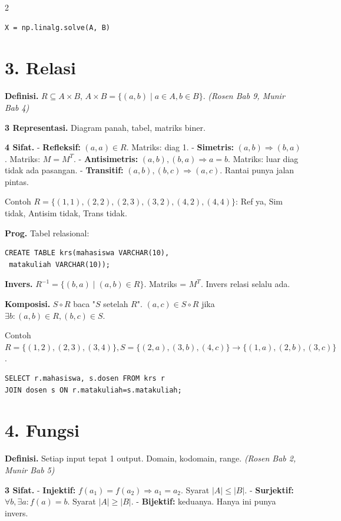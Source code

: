 \documentclass[8pt,a4paper]{extarticle}
\newcommand{\h}[1]{\textbf{#1}}
\newcommand{\src}[1]{\textit{(#1)}}
\begin{document}
\begin{multicols*}{2}
	\begin{lstlisting}
X = np.linalg.solve(A, B)
\end{lstlisting}

	\section*{3. Relasi}

	\h{Definisi.} $R\subseteq A\times B$, $A\times B{=}\{(a,b)\mid a\in A,b\in B\}$. \src{Rosen Bab 9, Munir Bab 4}

	\h{3 Representasi.} Diagram panah, tabel, matriks biner.

	\h{4 Sifat.}
	- \h{Refleksif:} $(a,a)\in R$. Matriks: diag 1.
	- \h{Simetris:} $(a,b)\Rightarrow(b,a)$. Matriks: $M{=}M^T$.
	- \h{Antisimetris:} $(a,b),(b,a)\Rightarrow a{=}b$. Matriks: luar diag tidak ada pasangan.
	- \h{Transitif:} $(a,b),(b,c)\Rightarrow(a,c)$. Rantai punya jalan pintas.

	Contoh $R{=}\{(1,1),(2,2),(2,3),(3,2),(4,2),(4,4)\}$: Ref ya, Sim tidak, Antisim tidak, Trans tidak.

	\h{Prog.} Tabel relasional:
	\begin{lstlisting}
CREATE TABLE krs(mahasiswa VARCHAR(10),
 matakuliah VARCHAR(10));
\end{lstlisting}

	\h{Invers.} $R^{-1}{=}\{(b,a)\mid(a,b)\in R\}$. Matriks = $M^T$. Invers relasi selalu ada.

	\h{Komposisi.} $S\circ R$ baca "$S$ setelah $R$". $(a,c)\in S\circ R$ jika $\exists b:(a,b)\in R,(b,c)\in S$.

	Contoh $R{=}\{(1,2),(2,3),(3,4)\},S{=}\{(2,a),(3,b),(4,c)\}\to\{(1,a),(2,b),(3,c)\}$.

	\begin{lstlisting}
SELECT r.mahasiswa, s.dosen FROM krs r
JOIN dosen s ON r.matakuliah=s.matakuliah;
\end{lstlisting}

	\section*{4. Fungsi}

	\h{Definisi.} Setiap input tepat 1 output. Domain, kodomain, range. \src{Rosen Bab 2, Munir Bab 5}

	\h{3 Sifat.}
	- \h{Injektif:} $f(a_1){=}f(a_2)\Rightarrow a_1{=}a_2$. Syarat $|A|\le|B|$.
	- \h{Surjektif:} $\forall b,\exists a:f(a){=}b$. Syarat $|A|\ge|B|$.
	- \h{Bijektif:} keduanya. Hanya ini punya invers.


\end{multicols*}
\end{document}
